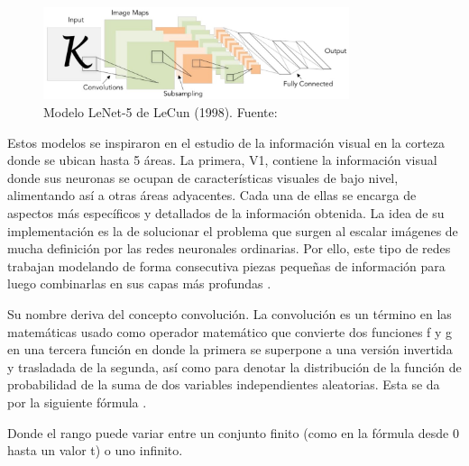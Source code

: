 \begin{itemize}
\begin{itemize}
\begin{figure}[htbp]
\begin{center}
				\includegraphics[width=0.8\textwidth]{2/figures/lenet5.jpg}
				\caption{Modelo LeNet-5 de LeCun (1998). Fuente: \cite{tec_li2019cnn}}
				\label{2:fig25}
			\end{center}
		\end{figure}
		
		Estos modelos se inspiraron en el estudio de la información visual en la corteza donde se ubican hasta 5 áreas. La primera, V1, contiene la información visual donde sus neuronas se ocupan de características visuales de bajo nivel, alimentando así a otras áreas adyacentes. Cada una de ellas se encarga de aspectos más específicos y detallados de la información obtenida. La idea de su implementación es la de solucionar el problema que surgen al escalar imágenes de mucha definición por las redes neuronales ordinarias. Por ello, este tipo de redes trabajan modelando de forma consecutiva piezas pequeñas de información para luego combinarlas en sus capas más profundas \parencite{tec_lopez2016cnnTF}.
		
		Su nombre deriva del concepto convolución. La convolución es un término en las matemáticas usado como operador matemático que convierte dos funciones f y g en una tercera función en donde la primera se superpone a una versión invertida y trasladada de la segunda, así como para denotar la distribución de la función de probabilidad de la suma de dos variables independientes aleatorias. Esta se da por la siguiente fórmula \parencite{tec_figueroa_convolucion}.
		
		Donde el rango puede variar entre un conjunto finito (como en la fórmula desde 0 hasta un valor t) o uno infinito.
		

\end{itemize}
\end{itemize}
